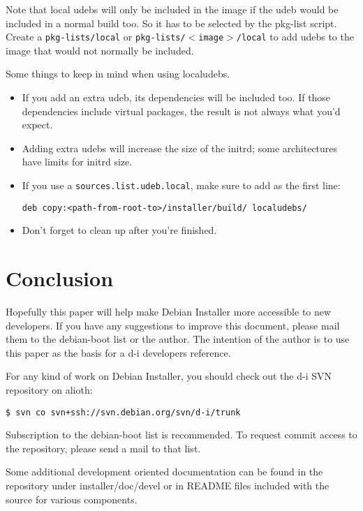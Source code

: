 \documentclass[a4paper,10pt]{article}
\begin{document}
Note that local udebs will only be included in the image if the udeb would be included in a normal build too. So it has to be selected by the pkg-list script. Create a \texttt{pkg-lists/local} or \texttt{pkg-lists/$<$image$>$/local} to add udebs to the image that would not normally be included. 

Some things to keep in mind when using localudebs. 

\begin{itemize}
\item If you add an extra udeb, its dependencies will be included too. If those dependencies include virtual packages, the result is not always what you'd expect. 
\item Adding extra udebs will increase the size of the initrd; some architectures have limits for initrd size. 
\item If you use a \texttt{sources.list.udeb.local}, make sure to add as the first line:
\begin{verbatim}
deb copy:<path-from-root-to>/installer/build/ localudebs/
\end{verbatim}
\item Don't forget to clean up after you're finished. 
\end{itemize}


\section{Conclusion}

Hopefully this paper will help make Debian Installer more accessible to new developers. If you have any suggestions to improve this document, please mail them to the debian-boot list or the author. The intention of the author is to use this paper as the basis for a d-i developers reference. 

For any kind of work on Debian Installer, you should check out the d-i SVN repository on alioth:

\begin{verbatim}
$ svn co svn+ssh://svn.debian.org/svn/d-i/trunk
\end{verbatim}

Subscription to the debian-boot list is recommended. To request commit access to the repository, please send a mail to that list.

Some additional development oriented documentation can be found in the repository under installer/doc/devel or in README files included with the source for various components.
\end{document}
